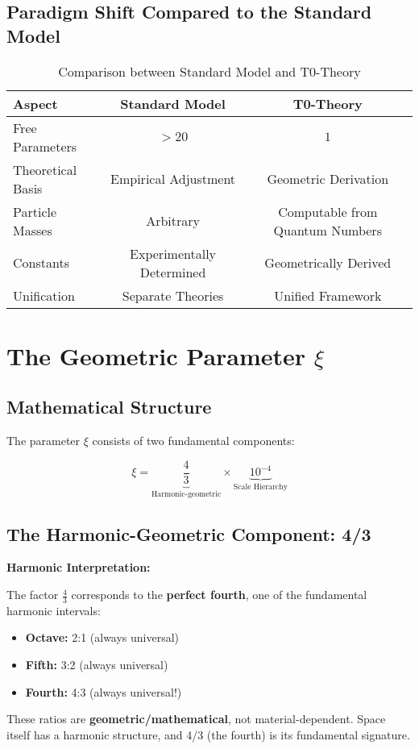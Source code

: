 \documentclass[12pt,a4paper]{article}
\newcommand{\xipar}{\xi}
\begin{document}
	\subsection{Paradigm Shift Compared to the Standard Model}
	
	\begin{table}[htbp]
		\centering
		\begin{tabular}{lcc}
			\toprule
			\textbf{Aspect} & \textbf{Standard Model} & \textbf{T0-Theory} \\
			\midrule
			Free Parameters & $> 20$ & $1$ \\
			Theoretical Basis & Empirical Adjustment & Geometric Derivation \\
			Particle Masses & Arbitrary & Computable from Quantum Numbers \\
			Constants & Experimentally Determined & Geometrically Derived \\
			Unification & Separate Theories & Unified Framework \\
			\bottomrule
		\end{tabular}
		\caption{Comparison between Standard Model and T0-Theory}
	\end{table}
	
	\section{The Geometric Parameter $\xipar$}
	
	\subsection{Mathematical Structure}
	
	The parameter $\xipar$ consists of two fundamental components:
	
	\begin{equation}
		\xipar = \underbrace{\frac{4}{3}}_{\text{Harmonic-geometric}} \times \underbrace{10^{-4}}_{\text{Scale Hierarchy}}
		\label{eq:xi_components}
	\end{equation}
	
	\subsection{The Harmonic-Geometric Component: 4/3}
	
	\begin{alternative}
		\textbf{Harmonic Interpretation:}
		
		The factor $\frac{4}{3}$ corresponds to the \textbf{perfect fourth}, one of the fundamental harmonic intervals:
		\begin{itemize}
			\item \textbf{Octave:} 2:1 (always universal)
			\item \textbf{Fifth:} 3:2 (always universal)  
			\item \textbf{Fourth:} 4:3 (always universal!)
		\end{itemize}
		
		These ratios are \textbf{geometric/mathematical}, not material-dependent. Space itself has a harmonic structure, and 4/3 (the fourth) is its fundamental signature.
	\end{alternative}
	
\end{document}
